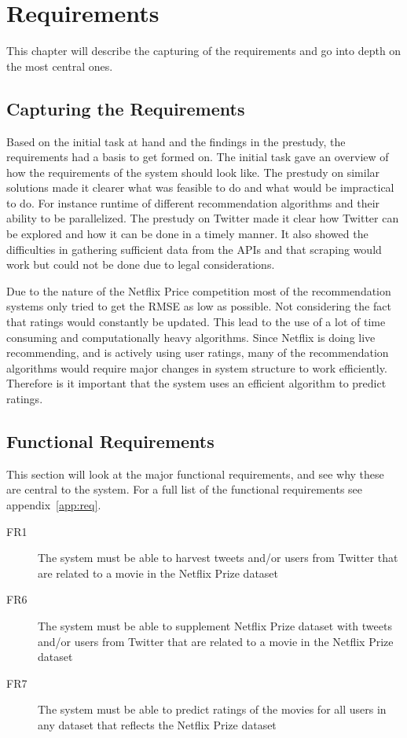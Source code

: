 
\chapter{Requirements}

\minitoc

This chapter will describe the capturing of the requirements and go into depth on the most central ones.

\clearpage

\section{Capturing the Requirements}
Based on the initial task at hand and the findings in the prestudy, the requirements had a basis to get formed on. The initial task gave an overview of how the requirements of the system should look like. The prestudy on similar solutions made it clearer what was feasible to do and what would be impractical to do. For instance runtime of different recommendation algorithms and their ability to be parallelized. The prestudy on Twitter made it clear how Twitter can be explored and how it can be done in a timely manner. It also showed the difficulties in gathering sufficient data from the APIs and that scraping would work but could not be done due to legal considerations.

Due to the nature of the Netflix Price competition most of the recommendation systems only tried to get the RMSE as low as possible. Not considering the fact that ratings would constantly be updated. This lead to the use of a lot of time consuming and computationally heavy algorithms. Since Netflix is doing live recommending, and is actively using user ratings, many of the recommendation algorithms would require major changes in system structure to work efficiently. Therefore is it important that the system uses an efficient algorithm to predict ratings.


\section{Functional Requirements}\label{section:functional-requirements}
This section will look at the major functional requirements, and see why these are central to the system. For a full list of the functional requirements see appendix~\ref{app:req}.
\begin{description}
  \item[FR1] The system must be able to harvest tweets and/or users from Twitter that are related to a movie in the Netflix Prize dataset
  \item[FR6] The system must be able to supplement Netflix Prize dataset with tweets and/or users from Twitter that are related to a movie in the Netflix Prize dataset
  \item[FR7] The system must be able to predict ratings of the movies for all users in any dataset that reflects the Netflix Prize dataset
\end{description}

